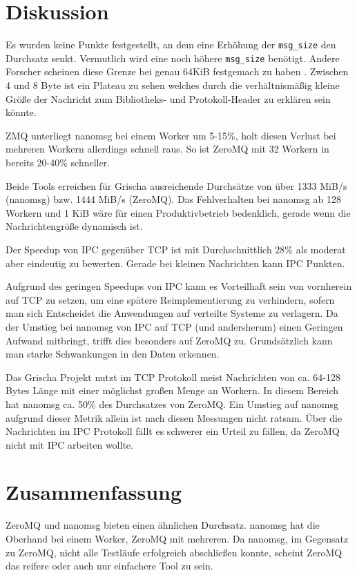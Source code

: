 \documentclass{article}
\begin{document}
\section{Diskussion}

Es wurden keine Punkte festgestellt, an dem eine Erhöhung der \texttt{msg\_size} den Durchsatz senkt. Vermutlich wird eine noch höhere \texttt{msg\_size} benötigt. Andere Forscher 
scheinen diese Grenze bei genau 64KiB festgemach zu haben \cite{barroso_benchmarking_2016}. 
Zwischen 4 und 8 Byte ist ein Plateau zu sehen welches durch die verhältnismäßig 
kleine Größe der Nachricht zum Bibliotheks- und Protokoll-Header zu erklären sein könnte.

ZMQ unterliegt nanomsg bei einem Worker um 5-15\%, holt diesen Verlust
bei mehreren Workern allerdings schnell raus. So ist ZeroMQ mit 32 Workern 
in bereits 20-40\% schneller.

Beide Tools erreichen für Grischa ausreichende Durchsätze von über 1333 MiB/s (nanomsg) bzw. 
1444 MiB/s (ZeroMQ). Das Fehlverhalten bei nanomsg ab 128 Workern und 1 KiB
wäre für einen Produktivbetrieb bedenklich, gerade wenn die Nachrichtengröße
dynamisch ist.

Der Speedup von IPC gegenüber TCP ist mit Durchschnittlich 28\% als
moderat aber eindeutig zu bewerten. Gerade bei kleinen Nachrichten kann IPC Punkten. 

Aufgrund des geringen Speedups von IPC kann es Vorteilhaft sein von vornherein 
auf TCP zu setzen, um eine spätere Reimplementierung zu verhindern, sofern
man sich Entscheidet die Anwendungen auf verteilte Systeme zu verlagern. 
Da der Umstieg bei nanomsg von IPC auf TCP (und andersherum) einen 
Geringen Aufwand mitbringt, trifft dies besonders auf ZeroMQ zu.
Grund\-sätz\-lich kann man starke Schwankungen in den Daten erkennen. 

Das Grischa Projekt nutzt im TCP Protokoll meist Nachrichten von 
ca. 64-128 Bytes Länge
mit einer möglichst großen Menge an Workern. In diesem Bereich hat
nanomsg ca. 50\% des Durchsatzes von ZeroMQ. Ein Umstieg auf nanomsg 
aufgrund dieser Metrik allein ist nach diesen Messungen nicht ratsam.
Über die Nachrichten im IPC Protokoll fällt es schwerer ein Urteil zu fällen,
da ZeroMQ nicht mit IPC arbeiten wollte. 

\section{Zusammenfassung}

ZeroMQ und nanomsg bieten einen ähnlichen Durchsatz. 
nanomsg hat die Oberhand bei einem Worker, ZeroMQ mit mehreren. 
Da nanomsg, im Gegensatz zu ZeroMQ, nicht alle Testläufe erfolgreich
abschließen konnte, scheint ZeroMQ das reifere oder auch nur 
einfachere Tool zu sein.
\end{document}
